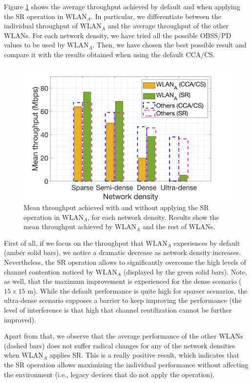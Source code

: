 \documentclass[preprint,12pt]{elsarticle}
\begin{document}
	Figure \ref{fig:SIM_2_1} shows the average throughput achieved by default and when applying the SR operation in $\text{WLAN}_A$. In particular, we differentiate between the individual throughput of $\text{WLAN}_A$ and the average throughput of the other WLANs. For each network density, we have tried all the possible OBSS/PD values to be used by $\text{WLAN}_A$. Then, we have chosen the best possible result and compare it with the results obtained when using the default CCA/CS.
	
	\begin{figure}[ht!]
		\centering		
		\includegraphics[width=0.4\columnwidth]{SIM_2_1}
		\caption{Mean throughput achieved with and without applying the SR operation in $\text{WLAN}_A$, for each network density. Results show the mean throughput achieved by $\text{WLAN}_A$ and the rest of WLANs.}
		\label{fig:SIM_2_1}
	\end{figure}
	
	First of all, if we focus on the throughput that $\text{WLAN}_A$ experiences by default (amber solid bars), we notice a dramatic decrease as network density increases. Nevertheless, the SR operation allows to significantly overcome the high levels of channel contention noticed by $\text{WLAN}_A$ (displayed by the green solid bars). Note, as well, that the maximum improvement is experienced for the dense scenario ($15\times15$ m). While the default performance is quite high for sparser scenarios, the ultra-dense scenario supposes a barrier to keep improving the performance (the level of interference is that high that channel reutilization cannot be further improved).
	
	Apart from that, we observe that the average performance of the other WLANs (dashed bars) does not suffer radical changes for any of the network densities when $\text{WLAN}_A$ applies SR. This is a really positive result, which indicates that the SR operation allows maximizing the individual performance without affecting the environment (i.e., legacy devices that do not apply the operation).
	
\end{document}
